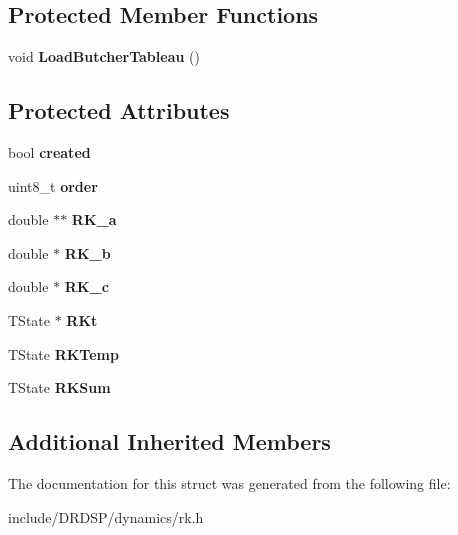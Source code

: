 \subsection*{Protected Member Functions}
\begin{DoxyCompactItemize}
\item 
\hypertarget{struct_d_r_d_s_p_1_1_r_k_a0dda6c176ad6bdbc3ab9a0335e93ac41}{void {\bfseries Load\-Butcher\-Tableau} ()}\label{struct_d_r_d_s_p_1_1_r_k_a0dda6c176ad6bdbc3ab9a0335e93ac41}

\end{DoxyCompactItemize}
\subsection*{Protected Attributes}
\begin{DoxyCompactItemize}
\item 
\hypertarget{struct_d_r_d_s_p_1_1_r_k_a3aaae4938fda4233eb534a0b8f00447a}{bool {\bfseries created}}\label{struct_d_r_d_s_p_1_1_r_k_a3aaae4938fda4233eb534a0b8f00447a}

\item 
\hypertarget{struct_d_r_d_s_p_1_1_r_k_aa1cb4cf6e8c886bdf302b94fd4c956a7}{uint8\-\_\-t {\bfseries order}}\label{struct_d_r_d_s_p_1_1_r_k_aa1cb4cf6e8c886bdf302b94fd4c956a7}

\item 
\hypertarget{struct_d_r_d_s_p_1_1_r_k_a41e74067cd7a50cb695b9ba9c91ad010}{double $\ast$$\ast$ {\bfseries R\-K\-\_\-a}}\label{struct_d_r_d_s_p_1_1_r_k_a41e74067cd7a50cb695b9ba9c91ad010}

\item 
\hypertarget{struct_d_r_d_s_p_1_1_r_k_afe71dbe94bf903d9c46a783ca7bd13a5}{double $\ast$ {\bfseries R\-K\-\_\-b}}\label{struct_d_r_d_s_p_1_1_r_k_afe71dbe94bf903d9c46a783ca7bd13a5}

\item 
\hypertarget{struct_d_r_d_s_p_1_1_r_k_aac56ed66a48db4bf8720dc4ae238296a}{double $\ast$ {\bfseries R\-K\-\_\-c}}\label{struct_d_r_d_s_p_1_1_r_k_aac56ed66a48db4bf8720dc4ae238296a}

\item 
\hypertarget{struct_d_r_d_s_p_1_1_r_k_a90a22b2e8c64a41a2f32a52086c39d53}{T\-State $\ast$ {\bfseries R\-Kt}}\label{struct_d_r_d_s_p_1_1_r_k_a90a22b2e8c64a41a2f32a52086c39d53}

\item 
\hypertarget{struct_d_r_d_s_p_1_1_r_k_a0bdd656619dd1cb0a9ff8712b4843910}{T\-State {\bfseries R\-K\-Temp}}\label{struct_d_r_d_s_p_1_1_r_k_a0bdd656619dd1cb0a9ff8712b4843910}

\item 
\hypertarget{struct_d_r_d_s_p_1_1_r_k_a977b11717ba5059cea913cd995634551}{T\-State {\bfseries R\-K\-Sum}}\label{struct_d_r_d_s_p_1_1_r_k_a977b11717ba5059cea913cd995634551}

\end{DoxyCompactItemize}
\subsection*{Additional Inherited Members}


The documentation for this struct was generated from the following file\-:\begin{DoxyCompactItemize}
\item 
include/\-D\-R\-D\-S\-P/dynamics/rk.\-h\end{DoxyCompactItemize}
